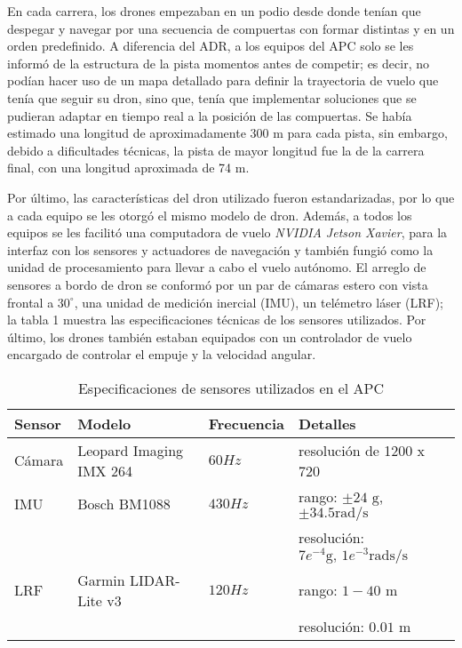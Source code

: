 En cada carrera, los drones empezaban en un podio desde donde tenían que despegar y navegar por una secuencia de compuertas con formar distintas y en un orden predefinido. A diferencia del ADR, a los equipos del APC solo se les informó de la estructura de la pista momentos antes de competir; es decir, no podían hacer uso de un mapa detallado para definir la trayectoria de vuelo que tenía que seguir su dron, sino que, tenía que implementar soluciones que se pudieran adaptar en tiempo real a la posición de las compuertas. Se había estimado una longitud de aproximadamente 300 m para cada pista, sin embargo, debido a dificultades técnicas, la pista de mayor longitud fue la de la carrera final, con una longitud aproximada de 74 m\cite{foehn2020alphapilot}.   

Por último, las características del dron utilizado fueron estandarizadas, por lo que a cada equipo se les otorgó el mismo modelo de dron. Además, a todos los equipos se les facilitó una computadora de vuelo \textit{NVIDIA Jetson Xavier}, para la interfaz con los sensores y actuadores de navegación y también fungió como la unidad de procesamiento para llevar a cabo el vuelo autónomo. El arreglo de sensores a bordo de dron se conformó por un par de cámaras estero con  vista frontal a $30^\circ$, una unidad de medición inercial (IMU), un telémetro láser (LRF); la tabla 1 muestra las especificaciones técnicas de los sensores utilizados. Por último, los drones también estaban equipados con un controlador de vuelo encargado de controlar el empuje y la velocidad angular.

\begin{table}
    \centering
    \begin{tabular}{llll}
        \hline
        Sensor & Modelo & Frecuencia & Detalles\\
        \hline
        Cámara & Leopard Imaging IMX 264 & $60 Hz$ & resolución de 1200 x 720\\
        IMU & Bosch BM1088 & $430 Hz$ & rango: $\pm 24 \text{ g}$, $\pm 34.5 \text{rad/s}$\\
         & & & resolución: $7e^{-4}\text{g, } 1e^{-3}\text{rads/s}$\\
        LRF & Garmin LIDAR-Lite v3 & $120 Hz$ & rango: $1-40$ m\\
        & & & resolución: $0.01 \text{ m}$\\
        \hline
    \end{tabular}
    \caption{Especificaciones de sensores utilizados en el APC \cite{foehn2020alphapilot}}
    \label{tab:sensors}
\end{table}

